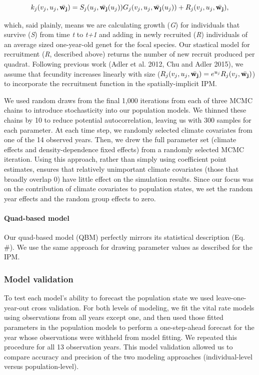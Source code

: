 \documentclass[12pt,]{article}
\begin{document}
\begin{equation}
k_{j}(v_{j},u_{j},\bar{\bold{w_{j}}}) = S_j(u_j, \bar{\bold{w_{j}}}(u_{j}))G_j(v_{j},u_{j},\bar{\bold{w_{j}}}(u_{j})) + R_j(v_{j},u_{j},\bar{\bold{w_{j}}}),
\end{equation}

which, said plainly, means we are calculating growth (\emph{G}) for
individuals that survive (\emph{S}) from time \emph{t} to \emph{t+1} and
adding in newly recruited (\emph{R}) individuals of an average sized
one-year-old genet for the focal species. Our stastical model for
recruitment (\emph{R}, described above) returns the number of new
recruit produced per quadrat. Following previous work (Adler et al.
2012, Chu and Adler 2015), we assume that fecundity increases linearly
with size
($R_j(v_{j},u_{j},\bar{\bold{w_{j}}}) = e^{u_j}R_j(v_{j},\bar{\bold{w_{j}}})$)
to incorporate the recruitment function in the spatially-implicit IPM.

We used random draws from the final 1,000 iterations from each of three
MCMC chains to introduce stochasticity into our population models. We
thinned these chains by 10 to reduce potential autocorrelation, leaving
us with 300 samples for each parameter. At each time step, we randomly
selected climate covariates from one of the 14 observed years. Then, we
drew the full parameter set (climate effects and density-dependence
fixed effects) from a randomly selected MCMC iteration. Using this
approach, rather than simply using coefficient point estimates, ensures
that relatively unimportant climate covariates (those that broadly
overlap 0) have little effect on the simulation results. Since our focus
was on the contribution of climate covariates to population states, we
set the random year effects and the random group effects to zero.

\paragraph{Quad-based model}\label{quad-based-model}

Our quad-based model (QBM) perfectly mirrors its statistical description
(Eq. \#). We use the same approach for drawing parameter values as
described for the IPM.

\subsubsection{Model validation}\label{model-validation}

To test each model's ability to forecast the population state we used
leave-one-year-out cross validation. For both levels of modeling, we fit
the vital rate models using observations from all years except one, and
then used those fitted parameters in the population models to perform a
one-step-ahead forecast for the year whose observations were withheld
from model fitting. We repeated this procedure for all 13 observation
years. This model validation allowed us to compare accuracy and
precision of the two modeling approaches (individual-level versus
population-level).
\end{document}
